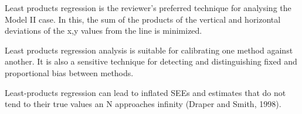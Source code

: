 \documentclass[12pt, a4paper]{report}
\theoremstyle{plain}
\theoremstyle{definition}
\theoremstyle{remark}
\begin{document}
 Least products regression is the reviewer's preferred technique for analysing the Model II case. In this, the sum of the products of the vertical and horizontal deviations of the x,y values from the line is minimized.
	
 Least products regression analysis is suitable for calibrating one method against another. It is also a sensitive technique for detecting and distinguishing fixed and proportional bias between
	methods.

Least-products regression can lead to inflated SEEs and estimates that do not tend to their true values an N approaches infinity (Draper and Smith, 1998).





\end{document}
